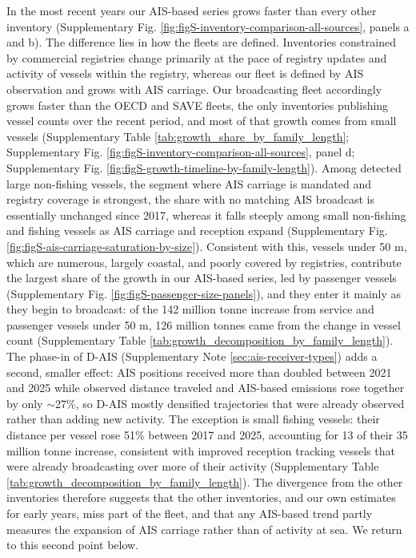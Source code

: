In the most recent years our AIS-based series grows faster than every other inventory (Supplementary Fig. \ref{fig:figS-inventory-comparison-all-sources}, panels a and b). The difference lies in how the fleets are defined. Inventories constrained by commercial registries change primarily at the pace of registry updates and activity of vessels within the registry, whereas our fleet is defined by AIS observation and grows with AIS carriage. Our broadcasting fleet accordingly grows faster than the OECD and SAVE fleets, the only inventories publishing vessel counts over the recent period, and most of that growth comes from small vessels (Supplementary Table \ref{tab:growth_share_by_family_length}; Supplementary Fig. \ref{fig:figS-inventory-comparison-all-sources}, panel d; Supplementary Fig. \ref{fig:figS-growth-timeline-by-family-length}). Among detected large non-fishing vessels, the segment where AIS carriage is mandated and registry coverage is strongest, the share with no matching AIS broadcast is essentially unchanged since 2017, whereas it falls steeply among small non-fishing and fishing vessels as AIS carriage and reception expand (Supplementary Fig. \ref{fig:figS-ais-carriage-saturation-by-size}). Consistent with this, vessels under 50 m, which are numerous, largely coastal, and poorly covered by registries, contribute the largest share of the growth in our AIS-based series, led by passenger vessels (Supplementary Fig. \ref{fig:figS-passenger-size-panels}), and they enter it mainly as they begin to broadcast: of the 142 million tonne increase from service and passenger vessels under 50 m, 126 million tonnes came from the change in vessel count (Supplementary Table \ref{tab:growth_decomposition_by_family_length}). The phase-in of D-AIS (Supplementary Note \ref{sec:ais-receiver-types}) adds a second, smaller effect: AIS positions received more than doubled between 2021 and 2025 while observed distance traveled and AIS-based emissions rose together by only $\sim$27\%, so D-AIS mostly densified trajectories that were already observed rather than adding new activity. The exception is small fishing vessels: their distance per vessel rose 51\% between 2017 and 2025, accounting for 13 of their 35 million tonne increase, consistent with improved reception tracking vessels that were already broadcasting over more of their activity (Supplementary Table \ref{tab:growth_decomposition_by_family_length}). The divergence from the other inventories therefore suggests that the other inventories, and our own estimates for early years, miss part of the fleet, and that any AIS-based trend partly measures the expansion of AIS carriage rather than of activity at sea. We return to this second point below.

